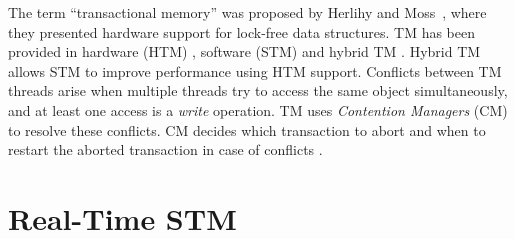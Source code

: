 \documentclass[12pt,english]{report}
\begin{document}
The term \textquotedblleft{}transactional memory\textquotedblright{}
was proposed by Herlihy and Moss~\cite{Herlihy:1993:TMA:165123.165164}, where they presented hardware
support for lock-free data structures. TM has been provided in hardware
(HTM) \cite{Herlihy:1993:TMA:165123.165164,Martinez:2002:SSA:605397.605400,Oplinger:2002:ESR:605397.605417,Rajwar:2002:TLE:605397.605399,ham04},
software (STM) \cite{4145102,Dolev:2008:CSC:1400751.1400769,Harris:2003:LSL:949305.949340,Harris:2005:CMT:1065944.1065952,Cho:2006:UAP:1141277.1141490,Marathe:2004:DTM:1066650.1066660,Yoo:2008:ATS:1378533.1378564,Saha:2006:ASS:1194816.1194838,Shpeisman:2007:EIO:1250734.1250744}
and hybrid TM \cite{dam06,Kumar:2006:HTM:1122971.1123003,Minh:2007:EHT:1250662.1250673,Shriraman:2007:IHA:1250662.1250676}.
Hybrid TM allows STM to improve performance using HTM support. Conflicts between TM threads arise when multiple threads try to access the same object simultaneously, and at least one access is a \textit{write} operation. TM uses \textit{Contention Managers} (CM) to resolve these conflicts. CM decides which transaction to abort and when to
restart the aborted transaction in case of conflicts \cite{Spear:2009:CSC:1504176.1504199,Scherer:2005:ACM:1073814.1073861,Blake:2009:PTS:1669112.1669133,Maldonado:2010:SST:1693453.1693465}.

\section{\label{sec:real-time stm}Real-Time STM}
\end{document}

